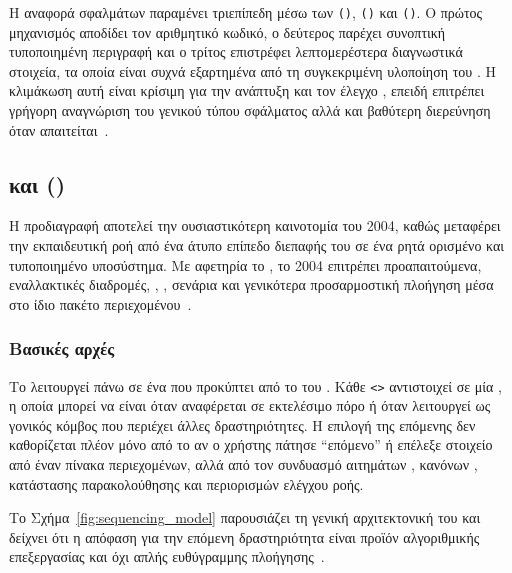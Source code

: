 Η αναφορά σφαλμάτων παραμένει τριεπίπεδη μέσω των \texttt{()}, \texttt{()} και \texttt{()}. Ο πρώτος μηχανισμός αποδίδει τον αριθμητικό κωδικό, ο δεύτερος παρέχει συνοπτική τυποποιημένη περιγραφή και ο τρίτος επιστρέφει λεπτομερέστερα διαγνωστικά στοιχεία, τα οποία είναι συχνά εξαρτημένα από τη συγκεκριμένη υλοποίηση του . Η κλιμάκωση αυτή είναι κρίσιμη για την ανάπτυξη και τον έλεγχο , επειδή επιτρέπει γρήγορη αναγνώριση του γενικού τύπου σφάλματος αλλά και βαθύτερη διερεύνηση όταν απαιτείται~\cite{ADL_SCORM2004_RTE, SCORM_Error_Reference}.

\subsection{ και  ()}
\label{subsec:scorm2004_sn}

Η προδιαγραφή  αποτελεί την ουσιαστικότερη καινοτομία του  2004, καθώς μεταφέρει την εκπαιδευτική ροή από ένα άτυπο επίπεδο διεπαφής του  σε ένα ρητά ορισμένο και τυποποιημένο υποσύστημα. Με αφετηρία το , το  2004 επιτρέπει προαπαιτούμενα, εναλλακτικές διαδρομές, , ,  σενάρια και γενικότερα προσαρμοστική πλοήγηση μέσα στο ίδιο πακέτο περιεχομένου~\cite{IMS_SimpleSequencing, ADL_SCORM2004_SN}.

\subsubsection{Βασικές αρχές }

Το  λειτουργεί πάνω σε ένα  που προκύπτει από το  του . Κάθε \texttt{<>} αντιστοιχεί σε μία , η οποία μπορεί να είναι  όταν αναφέρεται σε εκτελέσιμο πόρο ή  όταν λειτουργεί ως γονικός κόμβος που περιέχει άλλες δραστηριότητες. Η επιλογή της επόμενης  δεν καθορίζεται πλέον μόνο από το αν ο χρήστης πάτησε ``επόμενο'' ή επέλεξε στοιχείο από έναν πίνακα περιεχομένων, αλλά από τον συνδυασμό αιτημάτων , κανόνων , κατάστασης παρακολούθησης και περιορισμών ελέγχου ροής.

Το Σχήμα~\ref{fig:sequencing_model} παρουσιάζει τη γενική αρχιτεκτονική του  και δείχνει ότι η απόφαση για την επόμενη δραστηριότητα είναι προϊόν αλγοριθμικής επεξεργασίας και όχι απλής ευθύγραμμης πλοήγησης~\cite{ADL_SCORM2004_SN, IMS_SS_BehaviorModel}.

